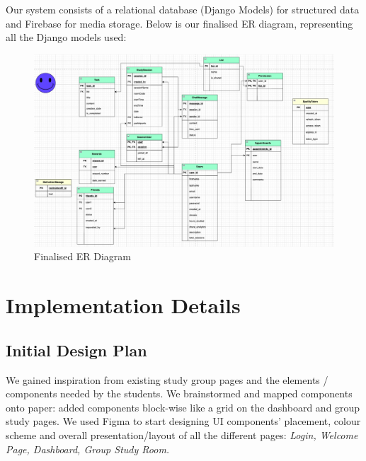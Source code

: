 Our system consists of a relational database (Django Models) for structured data and Firebase for media storage. Below is our finalised ER diagram, representing all the Django models used:

\begin{figure}
    \centering
    \includegraphics[width=1\linewidth]{ER-diagram.png}
    \caption{Finalised ER Diagram}
    \label{fig:er-diagram}
\end{figure}


\section{Implementation Details}
\label{sect:implementation-details}
\subsection{Initial Design Plan}
We gained inspiration from existing study group pages and the elements / components needed by the students. We brainstormed and mapped components onto paper: added components block-wise like a grid on the dashboard and group study pages. We used Figma to start designing UI components' placement, colour scheme and overall presentation/layout of all the different pages: \textit{Login, Welcome Page, Dashboard, Group Study Room.}

